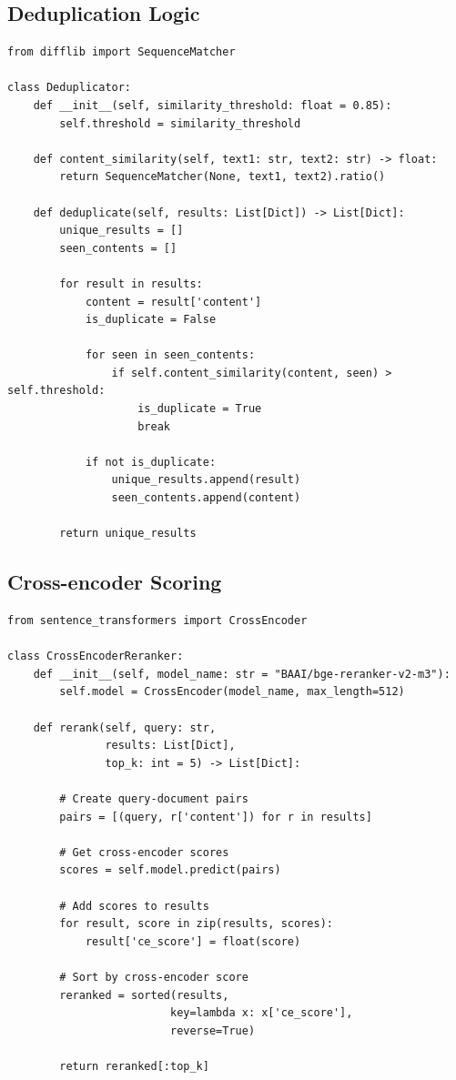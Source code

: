 \documentclass[../DoAn.tex]{subfiles}
\begin{document}
\subsection{Deduplication Logic}
\begin{verbatim}
from difflib import SequenceMatcher

class Deduplicator:
    def __init__(self, similarity_threshold: float = 0.85):
        self.threshold = similarity_threshold
    
    def content_similarity(self, text1: str, text2: str) -> float:
        return SequenceMatcher(None, text1, text2).ratio()
    
    def deduplicate(self, results: List[Dict]) -> List[Dict]:
        unique_results = []
        seen_contents = []
        
        for result in results:
            content = result['content']
            is_duplicate = False
            
            for seen in seen_contents:
                if self.content_similarity(content, seen) > self.threshold:
                    is_duplicate = True
                    break
            
            if not is_duplicate:
                unique_results.append(result)
                seen_contents.append(content)
        
        return unique_results
\end{verbatim}

\subsection{Cross-encoder Scoring}
\begin{verbatim}
from sentence_transformers import CrossEncoder

class CrossEncoderReranker:
    def __init__(self, model_name: str = "BAAI/bge-reranker-v2-m3"):
        self.model = CrossEncoder(model_name, max_length=512)
    
    def rerank(self, query: str, 
               results: List[Dict], 
               top_k: int = 5) -> List[Dict]:
        
        # Create query-document pairs
        pairs = [(query, r['content']) for r in results]
        
        # Get cross-encoder scores
        scores = self.model.predict(pairs)
        
        # Add scores to results
        for result, score in zip(results, scores):
            result['ce_score'] = float(score)
        
        # Sort by cross-encoder score
        reranked = sorted(results, 
                         key=lambda x: x['ce_score'], 
                         reverse=True)
        
        return reranked[:top_k]
\end{verbatim}
\end{document}
